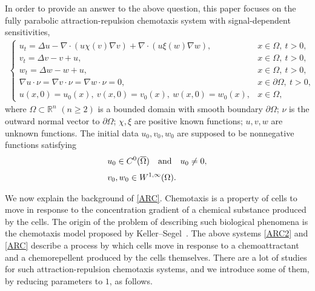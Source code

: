 \documentclass[12pt,reqno,draft]{article}
\numberwithin{equation}{section}
\theoremstyle{theorem}
\theoremstyle{definition}
\newcommand{\pa}{\partial}
\newcommand{\Rn}{\mathbb{R}^n}
\newcommand{\cl}[1]{{\overline#1}}
\begin{document}
In order to provide an answer to the above question, 
this paper focuses on 
the fully parabolic attraction-repulsion chemotaxis system with 
signal-dependent sensitivities, 
% 
    \begin{align} \label{ARC}
        \begin{cases}
        u_t=\Delta u-\nabla \cdot (u\chi(v)\nabla v)
                         +\nabla \cdot (u\xi(w)\nabla w),
        &x \in \Omega,\ t>0,
    \\[1.05mm]
        v_t=\Delta v-v+u,
        &x \in \Omega,\ t>0,
    \\[1.05mm]
        w_t=\Delta w-w+u,
        &x \in \Omega,\ t>0,
    \\[1.8mm]
        \nabla u \cdot \nu=\nabla v \cdot \nu=\nabla w \cdot \nu=0, 
        &x \in \pa \Omega,\ t>0,
    \\[1.05mm]
        u(x, 0)=u_0(x),\ v(x, 0)=v_0(x),\ w(x, 0)=w_0(x),
        &x \in \Omega,
        \end{cases}
    \end{align}
% 
where $\Omega \subset \Rn$ $(n \ge 2)$ is a bounded domain 
with smooth boundary $\pa \Omega$; 
$\nu$ is the outward normal vector to $\pa \Omega$; 
$\chi, \xi$ are positive known functions; 
$u, v, w$ are unknown functions.  
The initial data $u_0, v_0, w_0$ are supposed to be nonnegative 
functions satisfying
% 
    \begin{align} \label{KF}
            &u_0 \in C^0(\cl{\Omega})
    \quad
            {\rm and}
    \quad 
            u_0 \neq 0,
\\[1.05mm] \label{KF2}
            &v_0, w_0 \in W^{1,\infty}(\Omega).
    \end{align}
% 
\vspace{-4mm}

We now explain the background of 
\eqref{ARC}. 
Chemotaxis is a property of cells to move in response to 
the concentration gradient of a chemical substance produced by the cells. 
The origin of the problem of describing such biological phenomena is 
the chemotaxis model proposed by Keller--Segel~\cite{KS-1970}.
The above systems \eqref{ARC2} and \eqref{ARC} describe a process by which cells move 
in response to a chemoattractant and a chemorepellent produced 
by the cells themselves. 
There are a lot of studies for such attraction-repulsion chemotaxis systems, and 
we introduce some of them, by reducing 
parameters to $1$, as follows.
\vspace{2mm}
\end{document}
